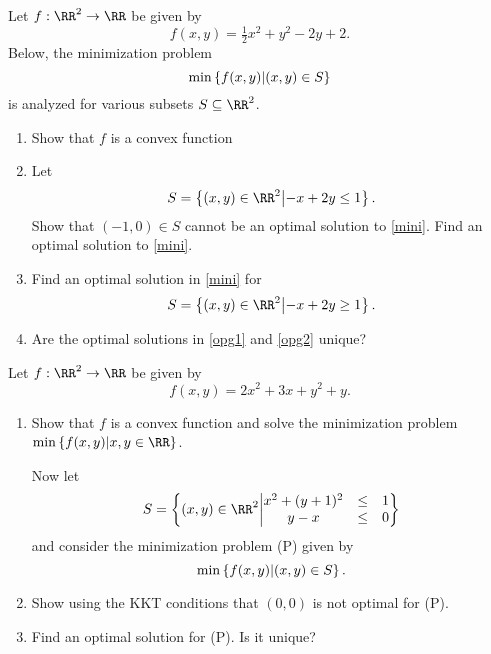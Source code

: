 \documentclass{article}
\begin{document}
  Let $f:\RR^2\rightarrow \RR$ be given by
  \begin{equation*}
    f(x, y) = \tfrac{1}{2} x^2+ y^2-2 y+2.
  \end{equation*}
  Below, the minimization problem
  \begin{equation}\label{mini}
    \min\left\{  f(x, y)  \middle|  (x, y) \in S  \right\}
  \end{equation}
  is analyzed for various subsets $S\subseteq \RR^2$.
  \begin{enumerate}
  \item Show that $f$ is a convex function
  \item \label{opg1} Let
    \begin{equation*}
      S =\Set{ (x, y)\in \RR^2 }{ - x + 2y \leq 1 }.
    \end{equation*}
    Show that $(-1, 0)\in S$ cannot be an optimal solution to
    \eqref{mini}. Find an optimal solution to \eqref{mini}.

  \item\label{opg2} Find an optimal solution in \eqref{mini} for
    \begin{equation*}
      S =\Set{ (x, y)\in \RR^2 }{ -x + 2y \geq 1 }.
    \end{equation*}
  \item Are the optimal solutions in \ref{opg1} and \ref{opg2} unique?
  \end{enumerate}
  \endshex

  
  \beginshex
  
  Let $f:\RR^2\rightarrow \RR$ be given by
  \begin{equation*}
    f(x, y) = 2x^2 +3 x + y^2 + y.
  \end{equation*}
  \begin{enumerate}
  \item Show that $f$ is a convex function and solve the minimization
    problem $\min\Set{ f(x, y) }{ x, y\in \RR }$.

    Now let
    \begin{equation*}
      S = \Set{ (x, y)\in \RR^2 }{
        \begin{matrix}
          x^2 +  (y+1)^2 & \leq & 1 \\
          y  -  x & \leq & 0
        \end{matrix}
      }
    \end{equation*}
    and consider the minimization problem (P) given by
    \begin{equation*}
      \min\left\{  f(x, y)  \middle|  (x, y)\in S  \right\}.
    \end{equation*}

  \item Show using the KKT conditions that $(0,0)$ is not optimal for
    (P).

  \item Find an optimal solution for (P). Is it unique?
  \end{enumerate}
\endshex
\end{document}
